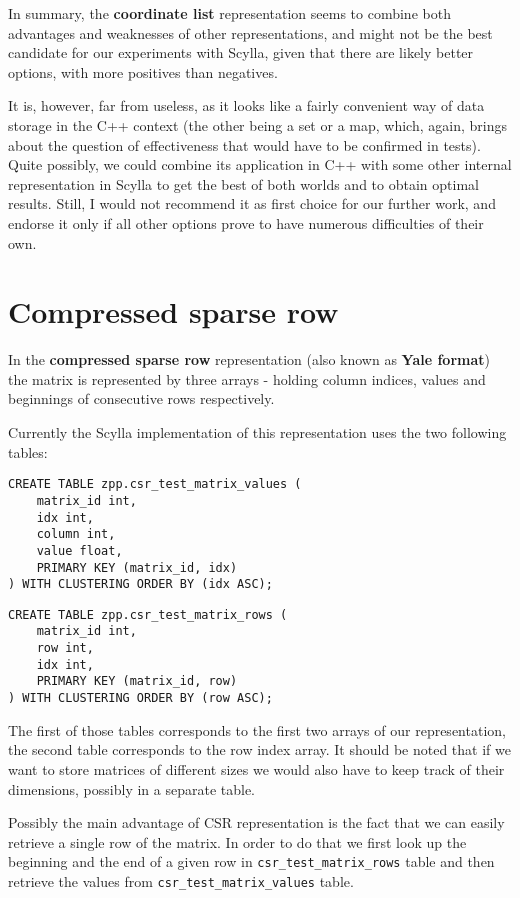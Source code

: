 \documentclass{article}
\newcommand{\code}[0]{\texttt}
\begin{document}
In summary, the \textbf{coordinate list} representation seems to combine both advantages and weaknesses of other representations, and might not be the best candidate for our experiments with Scylla, given that there are likely better options, with more positives than negatives. 

It is, however, far from useless, as it looks like a fairly convenient way of data storage in the C++ context (the other being a set or a map, which, again, brings about the question of effectiveness that would have to be confirmed in tests). Quite possibly, we could combine its application in C++ with some other internal representation in Scylla to get the best of both worlds and to obtain optimal results. Still, I would not recommend it as first choice for our further work, and endorse it only if all other options prove to have numerous difficulties of their own.

\pagebreak
\section{Compressed sparse row}

In the \textbf{compressed sparse row} representation (also known as \textbf{Yale format}) the matrix is represented by three arrays - holding column indices, values and beginnings of consecutive rows respectively.

Currently the Scylla implementation of this representation uses the two following tables:

\begin{lstlisting}[style=SQLStyle]
CREATE TABLE zpp.csr_test_matrix_values (
	matrix_id int,
	idx int,
	column int,
	value float,
	PRIMARY KEY (matrix_id, idx)
) WITH CLUSTERING ORDER BY (idx ASC);
\end{lstlisting}

\begin{lstlisting}[style=SQLStyle]
CREATE TABLE zpp.csr_test_matrix_rows (
	matrix_id int,
	row int,
	idx int,
	PRIMARY KEY (matrix_id, row)
) WITH CLUSTERING ORDER BY (row ASC);
\end{lstlisting}

The first of those tables corresponds to the first two arrays of our representation, the second table corresponds to the row index array. It should be noted that if we want to store matrices of different sizes we would also have to keep track of their dimensions, possibly in a separate table.

Possibly the main advantage of CSR representation is the fact that we can easily retrieve a single row of the matrix. In order to do that we first look up the beginning and the end of a given row in \code{csr\_test\_matrix\_rows} table and then retrieve the values from \code{csr\_test\_matrix\_values} table.
\end{document}
